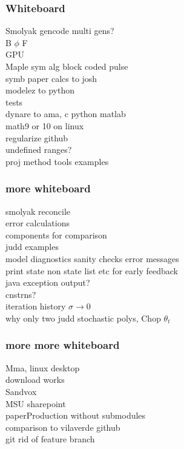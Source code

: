 \documentclass[handout]{beamer}
\begin{document}
\begin{frame}
  \frametitle{Whiteboard}
  \begin{description}
  \item[Smolyak gencode multi gens?]
  \item[B $\phi$ F]
  \item[GPU]
  \item[Maple sym alg block coded pulse]
  \item[symb paper calcs to josh]
  \item[modelez to python]
  \item[tests]
  \item[dynare to ama, c python matlab]
  \item[math9 or 10 on linux]
  \item[regularize github]
  \item[undefined ranges?]
  \item[proj method tools examples] 
  \end{description}
\end{frame}

\begin{frame}
  \frametitle{more whiteboard}
  \begin{description}
  \item[smolyak reconcile]
  \item[error calculations]
  \item[components for comparison]
  \item[judd examples]
  \item[model diagnostics sanity checks error messages ]
  \item[print state non state list etc for early feedback]
  \item[java exception output?]
  \item[cnstrns?]
  \item[iteration history $\sigma \rightarrow 0$]
  \item[why only two judd stochastic polys,  Chop $\theta_t$]
  \end{description}
\end{frame}


\begin{frame}
  \frametitle{more more whiteboard}
  \begin{description}
  \item[Mma, linux desktop]
  \item[download works]
  \item[Sandvox]
  \item[MSU sharepoint]
  \item[paperProduction without submodules]

  \item[comparison to vilaverde github]
  \item[git rid of feature branch] 
\end{description}
\end{frame}
\end{document}
